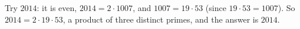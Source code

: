Try $2014$: it is even, $2014=2\cdot1007$, and $1007=19\cdot53$ (since $19\cdot53=1007$). So $2014=2\cdot19\cdot53$, a product of three distinct primes, and the answer is $\boxed{2014}$.
